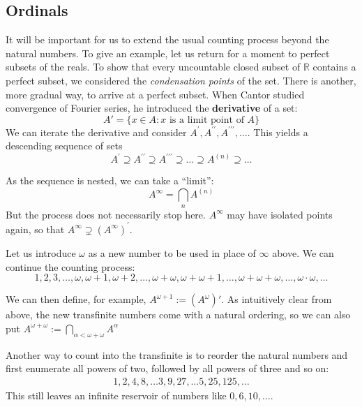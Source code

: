 \subsection{Ordinals}

It will be important for us to extend the usual counting process beyond the natural numbers. To give an example, let us return for a moment to perfect subsets of the reals. To show that every uncountable closed subset of $\mathbb{R}$ contains a perfect subset, we considered the \textit{condensation points} of the set. There is another, more gradual way, to arrive at a perfect subset. When Cantor studied convergence of Fourier series, he introduced the \textbf{derivative} of a set:
\begin{equation}

A' = \{ x \in A \colon x \text{ is a limit point of } A\}
\end{equation}
We can iterate the derivative and consider $A^\prime, A^{\prime\prime}, A^{\prime\prime\prime}, \dots$. This yields a descending sequence of sets
\begin{equation}

A^\prime \supseteq  A^{\prime\prime} \supseteq A^{\prime\prime\prime} \supseteq \dots \supseteq A^{(n)} \supseteq \dots
\end{equation}

As the sequence is nested, we can take a ``limit'':
\begin{equation}

A^{\infty} = \bigcap_n A^{(n)}
\end{equation}
But the process does not necessarily stop here. $A^\infty$ may have isolated points again, so that $A^\infty \supsetneq (A^\infty)^\prime$.

Let us introduce $\omega$ as a new number to be used in place of $\infty$ above. We can continue the counting process:
\begin{equation}

1,2,3, \dots, \omega, \omega+1, \omega+2, \dots, \omega + \omega, \omega + \omega +1, \dots, \omega + \omega + \omega, \dots, \omega\cdot \omega, \dots
\end{equation}

We can then define, for example,
$A^{\omega+1} := (A^{\omega})'$. As intuitively clear from above, the new transfinite numbers come with a natural ordering, so we can also put $A^{\omega+\omega} := \bigcap_{\alpha < \omega+\omega} A^{\alpha}$

Another way to count into the transfinite is to reorder the natural numbers and first enumerate all powers of two, followed by all powers of three and so on:
\begin{gather*}
	1, 2, 4, 8, \ldots 3, 9, 27, \ldots 5, 25, 125, \ldots
\end{gather*}
This still leaves an infinite reservoir of numbers like $0, 6, 10, \dots$.

